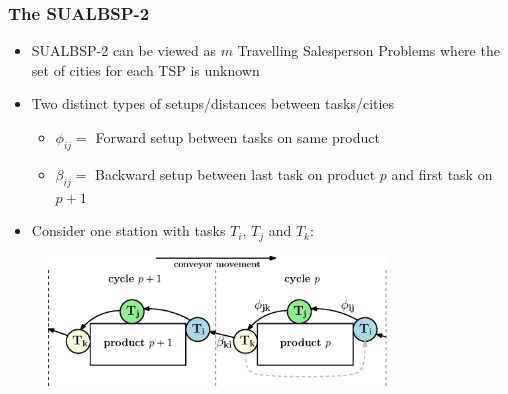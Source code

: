 \documentclass{beamer}
\begin{document}
\begin{frame}
\frametitle{The SUALBSP-2}
\begin{itemize}
	\item SUALBSP-2 can be viewed as $m$ Travelling Salesperson Problems where the set of cities for each TSP is unknown\vspace{3mm}\pause
	\item Two distinct types of setups/distances between tasks/cities\vspace{1mm}
	\begin{itemize}
		\item $\phi_{ij}=$ Forward setup between tasks on same product\vspace{1mm}
		\item $\beta_{ij}=$ Backward setup between last task on product $p$ and first task on $p+1$\vspace{2mm}\pause
	\end{itemize}
	\item Consider one station with tasks $T_i$, $T_j$ and $T_k$:
\end{itemize}

\begin{figure}
	\centering
	\includegraphics[width=0.8\textwidth]{images/IntroForwBackSetupEx.eps}
\end{figure}
\end{frame}
\end{document}
